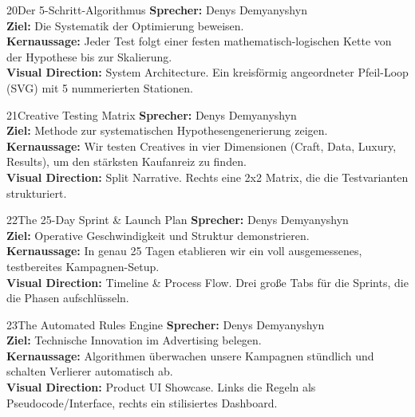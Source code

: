 \documentclass[11pt,a4paper]{article}
\begin{document}
\begin{slidebox}{20}{Der 5-Schritt-Algorithmus}
    \textbf{Sprecher:} Denys Demyanyshyn \\
    \textbf{Ziel:} Die Systematik der Optimierung beweisen.\\
    \textbf{Kernaussage:} Jeder Test folgt einer festen mathematisch-logischen Kette von der Hypothese bis zur Skalierung.\\
    \textbf{Visual Direction:} System Architecture. Ein kreisförmig angeordneter Pfeil-Loop (SVG) mit 5 nummerierten Stationen.
\end{slidebox}

\begin{slidebox}{21}{Creative Testing Matrix}
    \textbf{Sprecher:} Denys Demyanyshyn \\
    \textbf{Ziel:} Methode zur systematischen Hypothesengenerierung zeigen.\\
    \textbf{Kernaussage:} Wir testen Creatives in vier Dimensionen (Craft, Data, Luxury, Results), um den stärksten Kaufanreiz zu finden.\\
    \textbf{Visual Direction:} Split Narrative. Rechts eine 2x2 Matrix, die die Testvarianten strukturiert.
\end{slidebox}

\begin{slidebox}{22}{The 25-Day Sprint \& Launch Plan}
    \textbf{Sprecher:} Denys Demyanyshyn \\
    \textbf{Ziel:} Operative Geschwindigkeit und Struktur demonstrieren.\\
    \textbf{Kernaussage:} In genau 25 Tagen etablieren wir ein voll ausgemessenes, testbereites Kampagnen-Setup.\\
    \textbf{Visual Direction:} Timeline \& Process Flow. Drei große Tabs für die Sprints, die die Phasen aufschlüsseln.
\end{slidebox}

\begin{slidebox}{23}{The Automated Rules Engine}
    \textbf{Sprecher:} Denys Demyanyshyn \\
    \textbf{Ziel:} Technische Innovation im Advertising belegen.\\
    \textbf{Kernaussage:} Algorithmen überwachen unsere Kampagnen stündlich und schalten Verlierer automatisch ab.\\
    \textbf{Visual Direction:} Product UI Showcase. Links die Regeln als Pseudocode/Interface, rechts ein stilisiertes Dashboard.
\end{slidebox}
\end{document}
